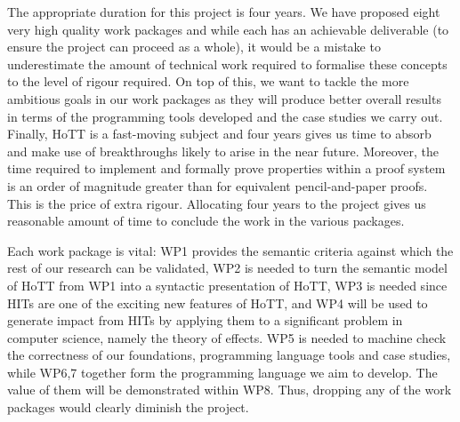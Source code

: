 \documentclass[a4paper,11pt]{article}
\begin{document}
 The appropriate duration for
this project is four years. We have proposed eight very high quality work
packages and while each has an achievable deliverable
(to ensure the project can proceed as a whole), it would be a mistake
to underestimate the amount of technical work required to formalise
these concepts to the level of rigour required. On top of this, we
want to tackle the more ambitious goals in our work packages as they
will produce better overall results in terms of the programming tools
developed and the case studies we carry out. Finally, HoTT is a
fast-moving subject and four years gives us time to absorb and make use
of breakthroughs likely to arise in the near future.  Moreover, the
time required to implement and formally prove properties within a
proof system is an order of magnitude greater than for equivalent
pencil-and-paper proofs. This is the price of extra rigour. Allocating
four years to the project gives us reasonable amount of time to conclude
the work in the various packages. %


\noindent Each work package is vital: WP1 provides
the semantic criteria against which the rest of our
research can be validated, WP2 is needed to turn the semantic model of
HoTT from WP1 into a syntactic presentation of HoTT, WP3 is needed
since HITs are one of the exciting new features of HoTT, and WP4 will
be used to generate impact from HITs by applying them to a significant
problem in computer science, namely the theory of effects. WP5 is
needed to machine check the correctness of our foundations,
programming language tools and case studies, while WP6,7
together form the programming language we aim to develop. The
value of them will be demonstrated within WP8.
Thus, dropping any of the work packages would clearly diminish the
project.

\vspace{0.02in}
\end{document}
